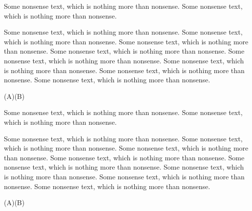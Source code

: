 \begin{framed}
Some nonsense text, which is nothing more than nonsense.
Some nonsense text, which is nothing more than nonsense.

\noindent{}

\vspace*{-1ex}
Some nonsense text, which is nothing more than nonsense.
Some nonsense text, which is nothing more than nonsense.
Some nonsense text, which is nothing more than nonsense.
Some nonsense text, which is nothing more than nonsense.
Some nonsense text, which is nothing more than nonsense.
Some nonsense text, which is nothing more than nonsense.
Some nonsense text, which is nothing more than nonsense.
Some nonsense text, which is nothing more than nonsense.

\vspace*{-2ex}
\noindent{}\psbrace[linecolor=red](A)(B){}

Some nonsense text, which is nothing more than nonsense.
Some nonsense text, which is nothing more than nonsense.

\medskip
\hfill\begin{minipage}{0.95\linewidth}
\noindent{}

\vspace*{-1ex}
Some nonsense text, which is nothing more than nonsense.
Some nonsense text, which is nothing more than nonsense.
Some nonsense text, which is nothing more than nonsense.
Some nonsense text, which is nothing more than nonsense.
Some nonsense text, which is nothing more than nonsense.
Some nonsense text, which is nothing more than nonsense.
Some nonsense text, which is nothing more than nonsense.
Some nonsense text, which is nothing more than nonsense.

\vspace*{-2ex}
\noindent{}\psbrace[linecolor=red](A)(B){}
\end{minipage}
\end{framed}

